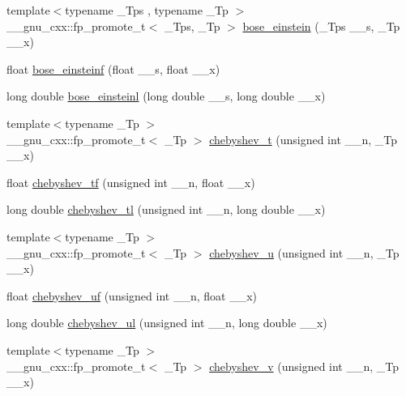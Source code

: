 \begin{DoxyCompactItemize}
{\footnotesize template$<$typename \+\_\+\+Tps , typename \+\_\+\+Tp $>$ }\\\+\_\+\+\_\+gnu\+\_\+cxx\+::fp\+\_\+promote\+\_\+t$<$ \+\_\+\+Tps, \+\_\+\+Tp $>$ \hyperlink{group__gnu__math__spec__func_gae8135b6861a48f2cee2e692093a17102}{bose\+\_\+einstein} (\+\_\+\+Tps \+\_\+\+\_\+s, \+\_\+\+Tp \+\_\+\+\_\+x)
\item 
float \hyperlink{group__gnu__math__spec__func_gac1fb313fba5639d4168b6ee682507688}{bose\+\_\+einsteinf} (float \+\_\+\+\_\+s, float \+\_\+\+\_\+x)
\item 
long double \hyperlink{group__gnu__math__spec__func_ga995c3ff580f81afb139f9cd50f445b48}{bose\+\_\+einsteinl} (long double \+\_\+\+\_\+s, long double \+\_\+\+\_\+x)
\item 
{\footnotesize template$<$typename \+\_\+\+Tp $>$ }\\\+\_\+\+\_\+gnu\+\_\+cxx\+::fp\+\_\+promote\+\_\+t$<$ \+\_\+\+Tp $>$ \hyperlink{group__gnu__math__spec__func_ga4d9cae9de13a64ceeb4fb0226f4b7844}{chebyshev\+\_\+t} (unsigned int \+\_\+\+\_\+n, \+\_\+\+Tp \+\_\+\+\_\+x)
\item 
float \hyperlink{group__gnu__math__spec__func_gab8cdb55702d9c8b85af4ecc3d8c6a134}{chebyshev\+\_\+tf} (unsigned int \+\_\+\+\_\+n, float \+\_\+\+\_\+x)
\item 
long double \hyperlink{group__gnu__math__spec__func_ga0c421700d244cdf58e3ac5ff267664d1}{chebyshev\+\_\+tl} (unsigned int \+\_\+\+\_\+n, long double \+\_\+\+\_\+x)
\item 
{\footnotesize template$<$typename \+\_\+\+Tp $>$ }\\\+\_\+\+\_\+gnu\+\_\+cxx\+::fp\+\_\+promote\+\_\+t$<$ \+\_\+\+Tp $>$ \hyperlink{group__gnu__math__spec__func_gafa90c06bdedb8459f20576297cf1608f}{chebyshev\+\_\+u} (unsigned int \+\_\+\+\_\+n, \+\_\+\+Tp \+\_\+\+\_\+x)
\item 
float \hyperlink{group__gnu__math__spec__func_ga4b28c2a079eae2e9612c9902801ca256}{chebyshev\+\_\+uf} (unsigned int \+\_\+\+\_\+n, float \+\_\+\+\_\+x)
\item 
long double \hyperlink{group__gnu__math__spec__func_ga11ec202d6aacafba1182e962ecf02978}{chebyshev\+\_\+ul} (unsigned int \+\_\+\+\_\+n, long double \+\_\+\+\_\+x)
\item 
{\footnotesize template$<$typename \+\_\+\+Tp $>$ }\\\+\_\+\+\_\+gnu\+\_\+cxx\+::fp\+\_\+promote\+\_\+t$<$ \+\_\+\+Tp $>$ \hyperlink{group__gnu__math__spec__func_ga32b7decd0002f542d2c9187c5f0846c6}{chebyshev\+\_\+v} (unsigned int \+\_\+\+\_\+n, \+\_\+\+Tp \+\_\+\+\_\+x)

\end{DoxyCompactItemize}
